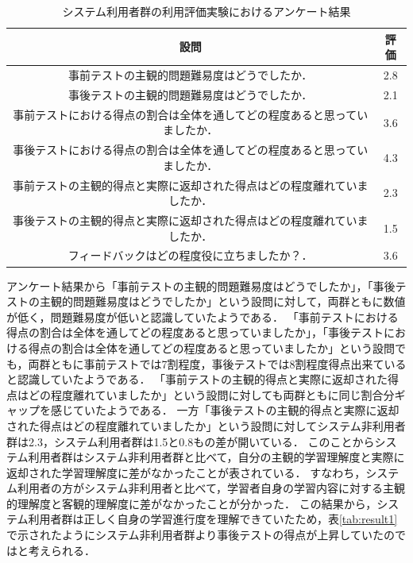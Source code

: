 \begin{table}[tb]
    \centering
    \caption{システム利用者群の利用評価実験におけるアンケート結果}
    \label{tab:system_anke}
    \begin{tabular}{|c|c|}
    \hline
     設問 & 評価 \\ \hline \hline
     事前テストの主観的問題難易度はどうでしたか． & 2.8 \\ \hline
     事後テストの主観的問題難易度はどうでしたか． & 2.1 \\ \hline
     事前テストにおける得点の割合は全体を通してどの程度あると思っていましたか． & 3.6 \\ \hline
     事後テストにおける得点の割合は全体を通してどの程度あると思っていましたか． & 4.3 \\ \hline
     事前テストの主観的得点と実際に返却された得点はどの程度離れていましたか． & 2.3 \\ \hline
     事後テストの主観的得点と実際に返却された得点はどの程度離れていましたか． & 1.5 \\ \hline
     フィードバックはどの程度役に立ちましたか？． & 3.6 \\ \hline
    \end{tabular}
\end{table}

アンケート結果から「事前テストの主観的問題難易度はどうでしたか」，「事後テストの主観的問題難易度はどうでしたか」という設問に対して，両群ともに数値が低く，問題難易度が低いと認識していたようである．
「事前テストにおける得点の割合は全体を通してどの程度あると思っていましたか」，「事後テストにおける得点の割合は全体を通してどの程度あると思っていましたか」という設問でも，両群ともに事前テストでは7割程度，事後テストでは8割程度得点出来ていると認識していたようである．
「事前テストの主観的得点と実際に返却された得点はどの程度離れていましたか」という設問に対しても両群ともに同じ割合分ギャップを感じていたようである．
一方「事後テストの主観的得点と実際に返却された得点はどの程度離れていましたか」という設問に対してシステム非利用者群は2.3，システム利用者群は1.5と0.8もの差が開いている．
このことからシステム利用者群はシステム非利用者群と比べて，自分の主観的学習理解度と実際に返却された学習理解度に差がなかったことが表されている．
すなわち，システム利用者の方がシステム非利用者と比べて，学習者自身の学習内容に対する主観的理解度と客観的理解度に差がなかったことが分かった．
この結果から，システム利用者群は正しく自身の学習進行度を理解できていたため，表\ref{tab:result1}で示されたようにシステム非利用者群より事後テストの得点が上昇していたのではと考えられる．